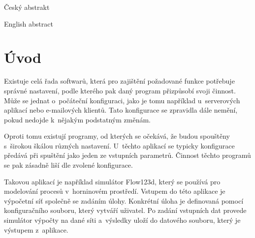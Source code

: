\documentclass[FM,bw,DP]{tulthesis}
\begin{document}

\begin{abstractCZ}
\thispagestyle{empty}
Český abstrakt
\end{abstractCZ}

\vspace{2cm}
\begin{abstractEN}
English abstract
\end{abstractEN}

\clearpage
\begin{acknowledgement}

\end{acknowledgement}

\renewcommand\contentsname{Obsah\vspace{-30pt}}
\tableofcontents
\clearpage

\listoffigures
\clearpage



\printnoidxglossary[type=\acronymtype,title=Seznam zkratek]



\chapter*{Úvod}

Existuje celá řada softwarů, která pro zajištění požadované funkce potřebuje správné nastavení, podle kterého pak daný program přizpůsobí svoji činnost. Může se jednat o~počáteční konfiguraci, jako je tomu například u~serverových aplikací nebo e-mailových klientů. Tato konfigurace se zpravidla dále nemění, pokud nedojde k~nějakým podstatným změnám.

Oproti tomu existují programy, od kterých se očekává, že budou spouštěny s~širokou škálou různých nastavení. U~těchto aplikací se typicky konfigurace předává při spuštění jako jeden ze vstupních parametrů. Činnost těchto programů se pak zásadně liší dle zvolené konfigurace.

Takovou aplikací je například simulátor Flow123d, který se používá pro modelování procesů v~horninovém prostředí. Vstupem do této aplikace je výpočetní síť společně se zadáním úlohy. Konkrétní úloha je definovaná pomocí konfiguračního souboru, který vytváří uživatel. Po zadání vstupních dat provede simulátor výpočty na dané síti a~výsledky uloží do datového souboru, který je výstupem z~aplikace.
\end{document}
